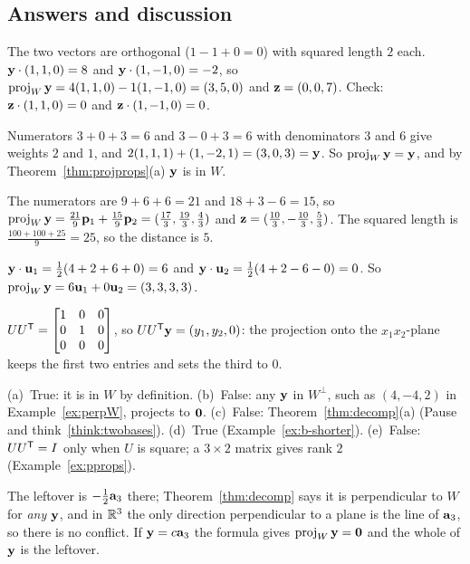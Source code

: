 \documentclass[11pt]{article}
\begin{document}
\subsection*{Answers and discussion}
\begin{description}[leftmargin=0pt,itemsep=5pt]
  \item[Knowledge Check \ref{kc:kcsplit}.] The two vectors are orthogonal ($1-1+0=0$) with squared length $2$ each. $\mathbf{y}\cdot(1,1,0)=8$ and $\mathbf{y}\cdot(1,-1,0)=-2$, so $\operatorname{proj}_W\mathbf{y}=4(1,1,0)-1(1,-1,0)=(3,5,0)$ and $\mathbf{z}=(0,0,7)$. Check: $\mathbf{z}\cdot(1,1,0)=0$ and $\mathbf{z}\cdot(1,-1,0)=0$.
  \item[Knowledge Check \ref{kc:kcinw}.] Numerators $3+0+3=6$ and $3-0+3=6$ with denominators $3$ and $6$ give weights $2$ and $1$, and $2(1,1,1)+(1,-2,1)=(3,0,3)=\mathbf{y}$. So $\operatorname{proj}_W\mathbf{y}=\mathbf{y}$, and by Theorem~\ref{thm:projprops}(a) $\mathbf{y}$ is in $W$.
  \item[Knowledge Check \ref{kc:kcdist}.] The numerators are $9+6+6=21$ and $18+3-6=15$, so $\operatorname{proj}_W\mathbf{y}=\tfrac{21}9\mathbf{p}_1+\tfrac{15}9\mathbf{p}_2=(\tfrac{17}3,\tfrac{19}3,\tfrac43)$ and $\mathbf{z}=(\tfrac{10}3,-\tfrac{10}3,\tfrac53)$. The squared length is $\tfrac{100+100+25}9=25$, so the distance is $5$.
  \item[Knowledge Check \ref{kc:kcorthonormal}.] $\mathbf{y}\cdot\mathbf{u}_1=\tfrac12(4+2+6+0)=6$ and $\mathbf{y}\cdot\mathbf{u}_2=\tfrac12(4+2-6-0)=0$. So $\operatorname{proj}_W\mathbf{y}=6\mathbf{u}_1+0\mathbf{u}_2=(3,3,3,3)$.
  \item[Knowledge Check \ref{kc:kcmat}.] $UU^{\mathsf T}=\begin{bmatrix}1&0&0\\0&1&0\\0&0&0\end{bmatrix}$, so $UU^{\mathsf T}\mathbf{y}=(y_1,y_2,0)$: the projection onto the $x_1x_2$-plane keeps the first two entries and sets the third to $0$.
  \item[Knowledge Check \ref{kc:kctf}.] (a)~True: it is in $W$ by definition. (b)~False: any $\mathbf{y}$ in $W^{\perp}$, such as $(4,-4,2)$ in Example~\ref{ex:perpW}, projects to $\mathbf{0}$. (c)~False: Theorem~\ref{thm:decomp}(a) (Pause and think~\ref{think:twobases}). (d)~True (Example~\ref{ex:b-shorter}). (e)~False: $UU^{\mathsf T}=I$ only when $U$ is square; a $3\times2$ matrix gives rank $2$ (Example~\ref{ex:pprops}).
  \item[Pause and think \ref{think:leftover}.] The leftover is $-\tfrac12\mathbf{a}_3$ there; Theorem~\ref{thm:decomp} says it is perpendicular to $W$ for \emph{any} $\mathbf{y}$, and in $\mathbb{R}^3$ the only direction perpendicular to a plane is the line of $\mathbf{a}_3$, so there is no conflict. If $\mathbf{y}=c\mathbf{a}_3$ the formula gives $\operatorname{proj}_W\mathbf{y}=\mathbf{0}$ and the whole of $\mathbf{y}$ is the leftover.

\end{description}
\end{document}
